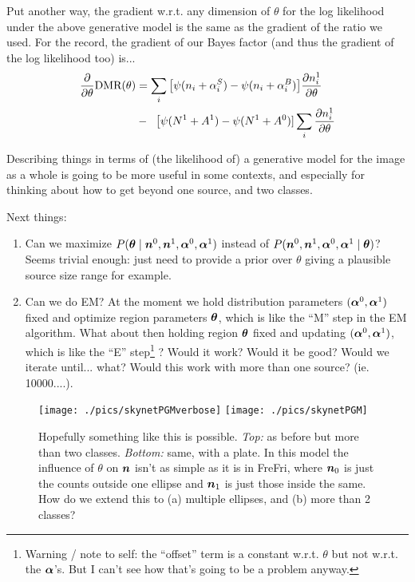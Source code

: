 \documentclass[12pt]{article}
\newcommand{\balpha}{\mbox{\boldmath $\alpha$}}
\newcommand{\btheta}{\mbox{\boldmath $\theta$}}
\newcommand{\bn}{\mbox{\boldmath $n$}}
\begin{document}
Put another way, the gradient w.r.t. any dimension of $\theta$ for the
log likelihood under the above generative model is the same as the
gradient of the ratio we used.  For the record, the gradient of our
Bayes factor (and thus the gradient of the log likelihood too) is...
\begin{align}
\frac{\partial}{\partial\theta}\text{DMR}(\theta) 
&= \sum_i \big[ \psi(n_i + \alpha^S_i) - \psi(n_i + \alpha^B_i) \big] \frac{\partial n^1_i}{\partial\theta} \notag\\
& - \;\; \big[\psi(N^1+A^1) - \psi(N^1+A^0)]\sum_i \frac{\partial n^1_i}{\partial\theta}
\end{align}


Describing things in terms of (the likelihood of) a generative model
for the image as a whole is going to be more useful in some contexts,
and especially for thinking about how to get beyond one source, and
two classes.


Next things:
\begin{enumerate}
\item Can we maximize $P(\btheta \mid \bn^0,  \bn^1, \balpha^0, \balpha^1)$ instead of $P(\bn^0,  \bn^1, \balpha^0, \balpha^1 \mid \btheta)$? Seems trivial enough: just need to provide a prior over $\theta$ giving a plausible source size range for example.
\item Can we do EM? At the moment we hold distribution parameters
  $(\balpha^0,\balpha^1)$ fixed and optimize region parameters
  $\btheta$, which is like the ``M'' step in the EM algorithm. What
  about then holding region $\btheta$ fixed and updating
  $(\balpha^0,\balpha^1)$, which is like the ``E''
  step\footnote{Warning / note to self: the ``offset'' term is a
    constant w.r.t. $\theta$ but not w.r.t. the $\balpha$'s. But I
    can't see how that's going to be a problem anyway.}  ? Would it
  work? Would it be good? Would we iterate until... what? Would this
  work with more than one source? (ie. 10000....).
\end{enumerate}

\begin{figure}
\texttt{[image: ./pics/skynetPGMverbose]}
\texttt{[image: ./pics/skynetPGM]}
\caption{Hopefully something like this is possible. {\it Top:} as
  before but more than two classes.  {\it Bottom:} same, with a plate.
  In this model the influence of $\theta$ on $\bn$ isn't as simple as
  it is in {\sc FreFri}, where $\bn_0$ is just the counts outside one
  ellipse and $\bn_1$ is just those inside the same. How do we extend
  this to (a) multiple ellipses, and (b) more than 2 classes?  }
\end{figure}
\end{document}
